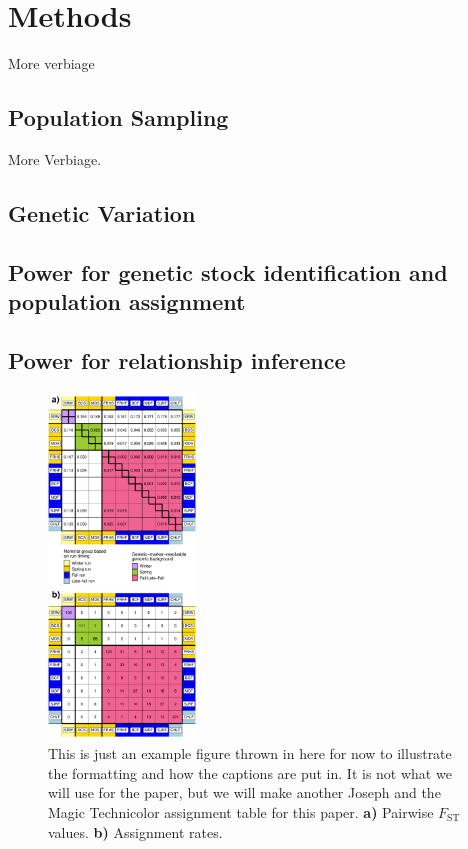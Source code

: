 \section*{Methods}

More verbiage

\subsection*{Population Sampling}

More Verbiage.


\subsection*{Genetic Variation}

\subsection*{Power for genetic stock identification and population assignment}

\subsection*{Power for relationship inference}

\begin{figure}
\newcommand{\examplecap}{\footnotesize This is just an example figure thrown
in here for now to illustrate the formatting and how the captions are put in. It is not what
we will use for the paper, but we will make another Joseph and the Magic Technicolor
assignment table for this paper.  {\bf a)} Pairwise $F_\mathrm{ST}$ values.
{\bf b)} Assignment rates.}
\begin{center}
\includegraphics[width=0.35\textwidth]{images/assign_and_fst_table.pdf}
\end{center}
\caption[\examplecap]{\examplecap}
\label{fig:example}
\end{figure}
